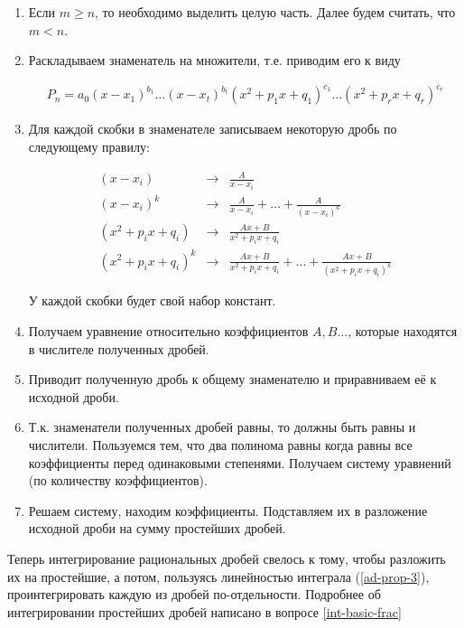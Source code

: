 \begin{enumerate}
  \item Если \(m \ge n\), то необходимо выделить целую часть. Далее будем
  считать, что \(m < n\).
  
  \item Раскладываем знаменатель на множители, т.е. приводим его к виду
  
  \begin{align*}
    P_{n} = a_{0}
      (x - x_{1})^{b_{1}} \dotsc (x - x_{t})^{b_{t}}
      (x^2 + p_{1} x + q_{1})^{c_{1}} \dots (x^2 + p_{r} x + q_{r})^{c_{r}}
  \end{align*}

  \item Для каждой скобки в знаменателе записываем некоторую дробь по
  следующему правилу:
  
  \begin{align*}
    (x - x_{i}) & \to & \frac{A}{x - x_{i}}
    \\
    (x - x_{i})^{k} & \to & \frac{A}{x - x_{i}}
      + \dotsc + \frac{A}{(x - x_{i})^{k}}
    \\
    (x^2 + p_{i} x + q_{i}) & \to & \frac{Ax + B}{x^2 + p_{i} x + q_{i}}
    \\
    (x^2 + p_{i} x + q_{i})^{k} & \to & \frac{Ax + B}{x^2 + p_{i} x + q_{i}}
      + \dotsc + \frac{Ax + B}{(x^2 + p_{i} x + q_{i})^{k}}
  \end{align*}

  У каждой скобки будет свой набор констант.

  \item Получаем уравнение относительно коэффициентов \(A, B \dots\), которые
  находятся в числителе полученных дробей.

  \item Приводит полученную дробь к общему знаменателю и приравниваем её к
  исходной дроби.

  \item Т.к. знаменатели полученных дробей равны, то должны быть равны и
  числители. Пользуемся тем, что два полинома равны когда равны все коэффициенты
  перед одинаковыми степенями. Получаем систему уравнений (по количеству
  коэффициентов).

  \item Решаем систему, находим коэффициенты. Подставляем их в разложение
  исходной дроби на сумму простейших дробей.
\end{enumerate}

Теперь интегрирование рациональных дробей свелось к тому, чтобы разложить их
на простейшие, а потом, пользуясь линейностью интеграла (\ref{ad-prop-3}),
проинтегрировать каждую из дробей по-отдельности.
Подробнее об интегрировании простейших дробей написано в вопросе
\ref{int-basic-frac}

